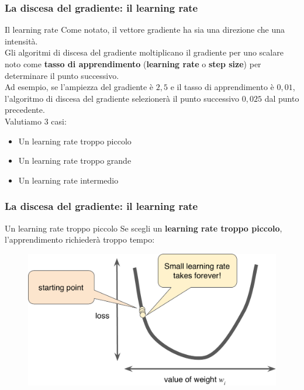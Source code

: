 \begin{frame}

	\frametitle{La discesa del gradiente: il learning rate}

	\begin{block}{Il learning rate}
		Come notato, il vettore gradiente ha sia una direzione che una intensità.\\
		Gli algoritmi di discesa del gradiente moltiplicano il gradiente per uno scalare noto come \textbf{tasso di apprendimento} (\textbf{learning rate} o \textbf{step size}) per determinare il punto successivo.\\
		\vspace{3mm}
		Ad esempio, se l'ampiezza del gradiente è $2,5$ e il tasso di apprendimento è $0,01$, l'algoritmo di discesa del gradiente selezionerà il punto successivo $0,025$ dal punto precedente.\\
		\vspace{3mm}
		Valutiamo 3 casi:
		\begin{itemize}
			\item Un learning rate troppo piccolo
			\item Un learning rate troppo grande
			\item Un learning rate intermedio
		\end{itemize}
	\end{block}

\end{frame}



\begin{frame}

	\frametitle{La discesa del gradiente: il learning rate}

	\begin{block}{Un learning rate troppo piccolo}
		Se scegli un \textbf{learning rate troppo piccolo}, l'apprendimento richiederà troppo tempo:

		\begin{figure}[!htbp]
			\centering
			\includegraphics[height=0.4\linewidth]{images/supervised/training_reducing_loss/LearningRateTooSmall.pdf}
		\end{figure}
	\end{block}

\end{frame}


